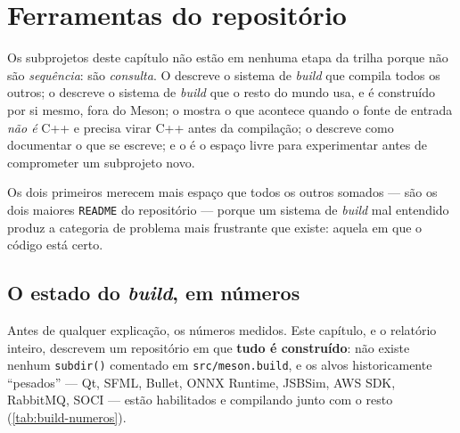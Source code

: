 
\section{Ferramentas do repositório}
\label{sec:ferramentas}

Os subprojetos deste capítulo não estão em nenhuma etapa da trilha porque não
são \emph{sequência}: são \emph{consulta}. O  descreve o sistema
de \emph{build} que compila todos os outros; o  descreve o
sistema de \emph{build} que o resto do mundo usa, e é construído por si mesmo,
fora do Meson; o  mostra o que acontece quando o fonte de
entrada \emph{não é} C++ e precisa virar C++ antes da compilação; o
 descreve como documentar o que se escreve; e o
 é o espaço livre para experimentar antes de comprometer um
subprojeto novo.

Os dois primeiros merecem mais espaço que todos os outros somados --- são os
dois maiores \texttt{README} do repositório --- porque um sistema de
\emph{build} mal entendido produz a categoria de problema mais frustrante que
existe: aquela em que o código está certo.

\subsection{O estado do \emph{build}, em números}
\label{sec:build-estado}

Antes de qualquer explicação, os números medidos. Este capítulo, e o relatório
inteiro, descrevem um repositório em que \textbf{tudo é construído}: não existe
nenhum \texttt{subdir()} comentado em \texttt{src/meson.build}, e os alvos
historicamente ``pesados'' --- Qt, SFML, Bullet, ONNX Runtime, JSBSim, AWS SDK,
RabbitMQ, SOCI --- estão habilitados e compilando junto com o resto
(\cref{tab:build-numeros}).

